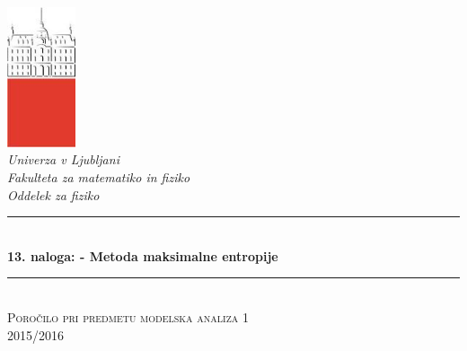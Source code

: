\documentclass[slovene,11pt,a4paper]{article}
\numberwithin{equation}{section} %
\numberwithin{figure}{section} %
\numberwithin{table}{section} %
\begin{document}
\begin{titlepage}

\newcommand{\HRule}{\rule{\linewidth}{0.5mm}} %

\center %


 

\includegraphics[width=2cm]{slike/aaa}\\[0.5cm]
 
\textit{Univerza v Ljubljani}\\
\textit{Fakulteta za {\color{red}matematiko in fiziko}}\\[0.5cm]

\emph{Oddelek za fiziko}\\[0.5cm] %


\HRule \\[0.4cm]
\huge {\bfseries 13. naloga: - Metoda maksimalne entropije}\\[0.4cm] %
\HRule \\[0.5cm] 

 \textsc{\large Poročilo pri predmetu modelska analiza 1}\\
 \textsc{\large 2015/2016}\\[1cm] %
 

\end{titlepage}
\end{document}
